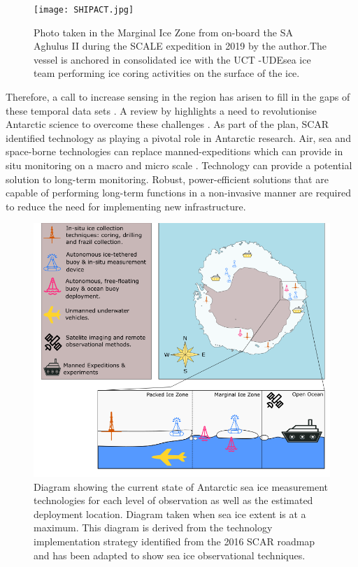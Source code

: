 \begin{figure}[H]
    \centering
    \texttt{[image: SHIPACT.jpg]}
    \caption{Photo taken in the Marginal Ice Zone from on-board the SA Aghulus II during the SCALE expedition in 2019 by the author.The vessel is anchored in consolidated ice with the UCT \protect\footnotemark -UDE\protect\footnotemark sea ice team performing ice coring activities on the surface of the ice.}
    \label{fig:cruise}
\end{figure}

Therefore, a call to increase sensing in the region has arisen to fill in the gaps of these temporal data sets \cite{kennicutt2019sustained}. A review by \textcite{kennicutt2016delivering} highlights a need to revolutionise Antarctic science to overcome these challenges \cite{kennicutt2016delivering}. As part of the plan, SCAR identified technology as playing a pivotal role in Antarctic research. Air, sea and space-borne technologies can replace manned-expeditions which can provide in situ monitoring on a macro and micro scale \cite{kennicutt2016delivering}. Technology can provide a potential solution to long-term monitoring. Robust, power-efficient solutions that are capable of performing long-term functions in a non-invasive manner are required to reduce the need for implementing new infrastructure.\par

\begin{figure}[H]
    \centering
    \includegraphics[scale=0.5]{tech.png}
    \caption{ Diagram showing the current state of Antarctic sea ice measurement technologies for each level of observation as well as the estimated deployment location. Diagram taken when sea ice extent is at a maximum. This diagram is derived from the technology implementation strategy identified from the 2016 SCAR roadmap \cite{kennicutt2019sustained}\protect\footnotemark \space and has been adapted to show sea ice observational techniques. }
    \label{fig:chapter1_tech_diag}
\end{figure}

